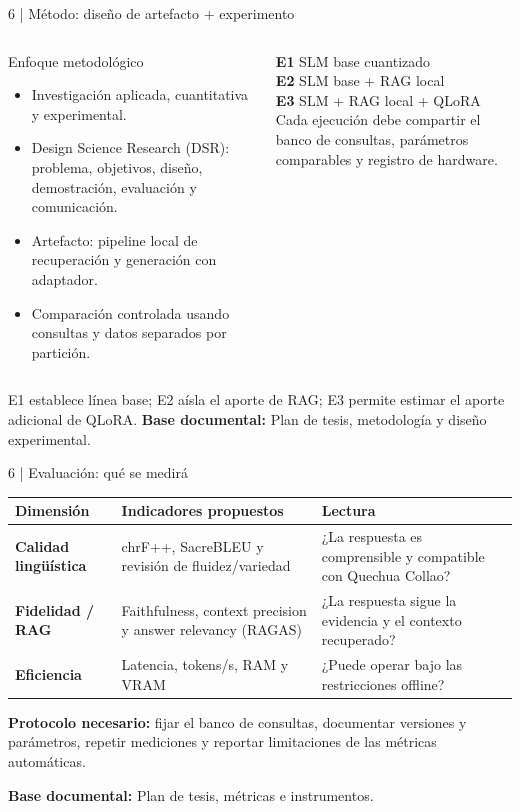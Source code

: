 \documentclass[aspectratio=169,10pt,spanish]{beamer}
\newcommand{\fuente}[1]{\vfill{\tiny\color{bpNavy!75}\textbf{Base documental:} #1}}
\begin{document}
\begin{frame}{6 | Método: diseño de artefacto + experimento}
\begin{columns}[T,onlytextwidth]
\begin{block}{Enfoque metodológico}
\small
\begin{itemize}
\item Investigación aplicada, cuantitativa y experimental.
\item Design Science Research (DSR): problema, objetivos, diseño, demostración, evaluación y comunicación.
\item Artefacto: pipeline local de recuperación y generación con adaptador.
\item Comparación controlada usando consultas y datos separados por partición.
\end{itemize}
\end{block}
\begin{tcolorbox}[colback=bpLightGray,colframe=bpBlue,title={Configuraciones}]
\small
\textbf{E1} \quad SLM base cuantizado\\[1mm]
\textbf{E2} \quad SLM base + RAG local\\[1mm]
\textbf{E3} \quad SLM + RAG local + QLoRA\\[2mm]
Cada ejecución debe compartir el banco de consultas, parámetros comparables y registro de hardware.
\end{tcolorbox}
\end{columns}
\vspace{0.1cm}
\centering\scriptsize E1 establece línea base; E2 aísla el aporte de RAG; E3 permite estimar el aporte adicional de QLoRA.
\fuente{Plan de tesis, metodología y diseño experimental.}
\end{frame}

\begin{frame}{6 | Evaluación: qué se medirá}
\small
\begin{tabularx}{\textwidth}{>{\bfseries}p{2.6cm} X p{4.1cm}}
\toprule
Dimensión & Indicadores propuestos & Lectura\\
\midrule
Calidad lingüística & chrF++, SacreBLEU y revisión de fluidez/variedad & ¿La respuesta es comprensible y compatible con Quechua Collao?\\
Fidelidad / RAG & Faithfulness, context precision y answer relevancy (RAGAS) & ¿La respuesta sigue la evidencia y el contexto recuperado?\\
Eficiencia & Latencia, tokens/s, RAM y VRAM & ¿Puede operar bajo las restricciones offline?\\
\bottomrule
\end{tabularx}
\vspace{0.23cm}
\begin{tcolorbox}[colback=bpLightGray,colframe=bpGold]
\centering\small\textbf{Protocolo necesario:} fijar el banco de consultas, documentar versiones y parámetros, repetir mediciones y reportar limitaciones de las métricas automáticas.
\end{tcolorbox}
\fuente{Plan de tesis, métricas e instrumentos.}
\end{frame}
\end{document}

